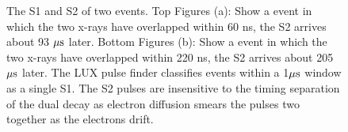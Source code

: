 \begin{figure}[h!]\centering
 

\caption{The S1 and S2 of two \KrCal events. Top Figures (a): Show a \KrCal event in which the two x-rays have overlapped within 60 ns, the S2 arrives about 93 $\rm \mu s$ later. Bottom Figures (b): Show a \KrCal event in which the two x-rays have overlapped within 220 ns, the S2 arrives about 205 $\rm \mu s$ later. The LUX pulse finder classifies events within a 1$\rm \mu s$ window as a single S1. The S2 pulses are insensitive to the timing separation of the dual decay as electron diffusion smears the pulses two together as the electrons drift.}
\label{fig:Kr_Waveform}
\end{figure}

\newpage

